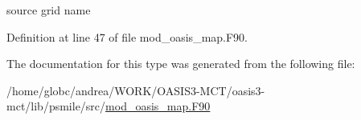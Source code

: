 source grid name 



Definition at line 47 of file mod\+\_\+oasis\+\_\+map.\+F90.



The documentation for this type was generated from the following file\+:\begin{DoxyCompactItemize}
\item 
/home/globc/andrea/\+W\+O\+R\+K/\+O\+A\+S\+I\+S3-\/\+M\+C\+T/oasis3-\/mct/lib/psmile/src/\hyperlink{mod__oasis__map_8_f90}{mod\+\_\+oasis\+\_\+map.\+F90}\end{DoxyCompactItemize}
